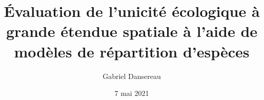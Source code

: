 \documentclass[12pt,twoside,maitrise]{template/dms}
\begin{document}



\title{Évaluation de l'unicité écologique à grande étendue spatiale à l'aide de 
       modèles de répartition d'espèces}

\author{Gabriel Dansereau}



\date{7 mai 2021} %










\end{document}
